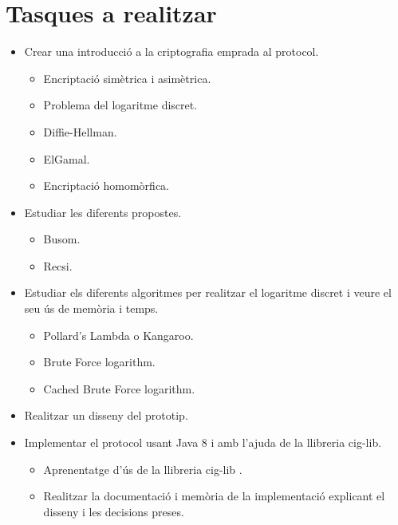 \documentclass{article}
\begin{document}
	\section{Tasques a realitzar}
	\begin{itemize}
		\item Crear una introducció a la criptografia emprada al protocol.
		\begin{itemize}
			\item Encriptació simètrica i asimètrica.
			\item Problema del logaritme discret.
			\item Diffie-Hellman.
			\item ElGamal.
			\item Encriptació homomòrfica.
		\end{itemize}
		\item Estudiar les diferents propostes.
		\begin{itemize}
			\item Busom.
			\item Recsi.
		\end{itemize}
		\item Estudiar els diferents algoritmes per realitzar el logaritme discret i veure el seu ús de memòria i temps.
		\begin{itemize}
			\item Pollard's Lambda o Kangaroo.
			\item Brute Force logarithm.
			\item Cached Brute Force logarithm.
		\end{itemize}
		\item Realitzar un disseny del prototip.
		\item Implementar el protocol usant Java 8 i amb l'ajuda de la llibreria cig-lib.
		\begin{itemize}
			\item Aprenentatge d'ús de la llibreria cig-lib \cite{ciglib}.
			\item Realitzar la documentació  i memòria de la implementació explicant el disseny i les decisions preses.
		\end{itemize}
	\end{itemize}
\end{document}
